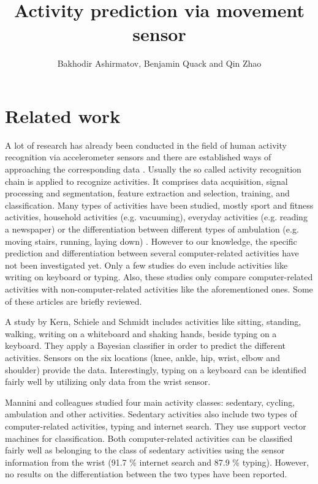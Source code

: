 \documentclass[11pt,a4paper]{paper}
\title{Activity prediction via movement sensor}
\author{Bakhodir Ashirmatov, Benjamin Quack and Qin Zhao}
\begin{document}
\maketitle

\section*{Related work}

A lot of research has already been conducted in the field of human activity recognition via
 accelerometer sensors and there are established ways of approaching the corresponding data \cite{bullingetal2014}.
Usually the so called activity recognition chain is applied to recognize activities. 
It comprises data acquisition, signal processing and segmentation, feature extraction and selection,
 training, and classification.
Many types of activities have been studied, mostly sport and fitness activities, household activities (e.g. vacuuming),
 everyday activities (e.g. reading a newspaper) or the differentiation between different types 
 of ambulation (e.g. moving stairs, running, laying down) \cite{banosetal2014}.
However to our knowledge, the specific prediction and differentiation between several computer-related activities have not been investigated yet.
Only a few studies do even include activities like writing on keyboard or typing. 
Also, these studies only compare computer-related activities with non-computer-related 
 activities like the aforementioned ones.
Some of these articles are briefly reviewed.
 
A study by Kern, Schiele and Schmidt \cite{kernetal2003} includes activities like sitting, standing, walking, writing on a whiteboard and shaking
 hands, beside typing on a keyboard.
They apply a Bayesian classifier in order to predict the different activities.
Sensors on the six locations (knee, ankle, hip, wrist, elbow and shoulder) provide the data.
Interestingly, typing on a keyboard can be identified fairly well by utilizing only data from the wrist sensor.

Mannini and colleagues \cite{manninietal2013} studied four main activity classes:
 sedentary, cycling, ambulation and other activities. 
Sedentary activities also include two types of computer-related activities, typing and 
 internet search.
They use support vector machines for classification. 
Both computer-related activities can be classified fairly well 
 as belonging to the class of sedentary activities using the sensor 
 information from the wrist (91.7 \% internet search and 87.9 \% typing).
However, no results on the differentiation between the two types
 have been reported.
\end{document}
